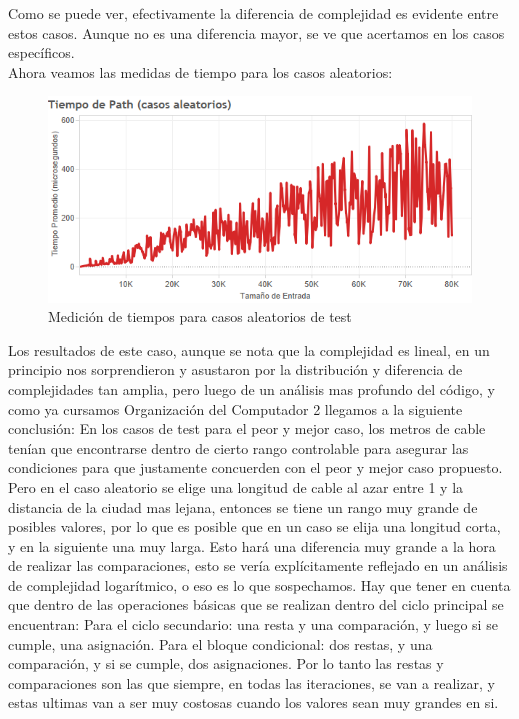 \documentclass{article}
\theoremstyle{definition}
\theoremstyle{remark}
\begin{document}
Como se puede ver, efectivamente la diferencia de complejidad es evidente entre estos casos. Aunque no es una diferencia mayor, se ve que acertamos en los casos específicos.\\

Ahora veamos las medidas de tiempo para los casos aleatorios:

\begin{figure}[h!]
\centering
\includegraphics[width=15cm]{docs/images/ex1-random.png}
\caption{Medición de tiempos para casos aleatorios de test}
\label{exp1plot}
\end{figure}

Los resultados de este caso, aunque se nota que la complejidad es lineal, en un principio nos sorprendieron y asustaron por la distribución y diferencia de complejidades tan amplia, pero luego de un análisis mas profundo del código, y como ya cursamos Organización del Computador 2 llegamos a la siguiente conclusión: En los casos de test para el peor y mejor caso, los metros de cable tenían que encontrarse dentro de cierto rango controlable para asegurar las condiciones para que justamente concuerden con el peor y mejor caso propuesto. Pero en el caso aleatorio se elige una longitud de cable al azar entre 1 y la distancia de la ciudad mas lejana, entonces se tiene un rango muy grande de posibles valores, por lo que es posible que en un caso se elija una longitud corta, y en la siguiente una muy larga. Esto hará una diferencia muy grande a la hora de realizar las comparaciones, esto se vería explícitamente reflejado en un análisis de complejidad logarítmico, o eso es lo que sospechamos. Hay que tener en cuenta que dentro de las operaciones básicas que se realizan dentro del ciclo principal se encuentran:
Para el ciclo secundario: una resta y una comparación, y luego si se cumple, una asignación.
Para el bloque condicional: dos restas, y una comparación, y si se cumple, dos asignaciones.
Por lo tanto las restas y comparaciones son las que siempre, en todas las iteraciones, se van a realizar, y estas ultimas van a ser muy costosas cuando los valores sean muy grandes en si.
\end{document}
